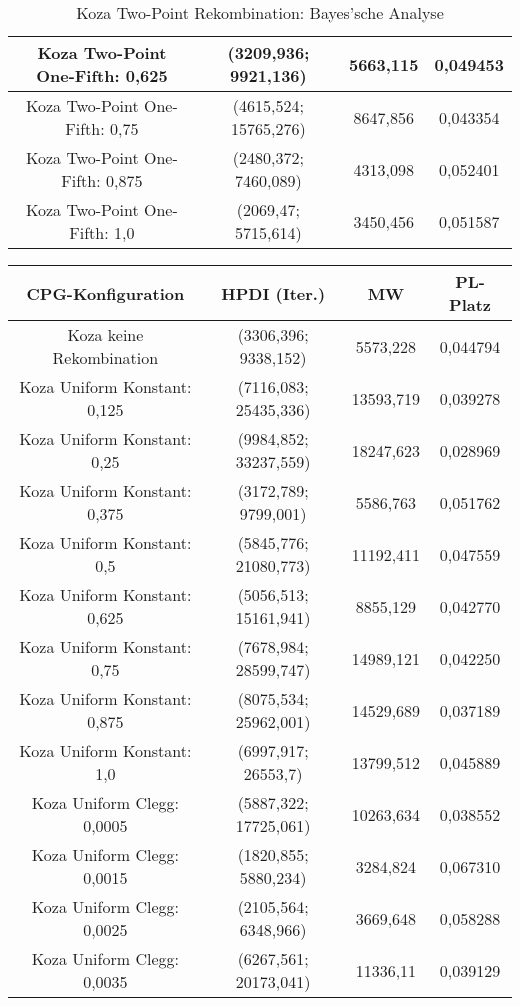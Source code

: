 \begin{table}[H]
\begin{tabular}{c | c | c | c}
		\hline
		Koza Two-Point One-Fifth: 0,625 & (3209,936; 9921,136) & 5663,115 & 0,049453\\
		\hline
		Koza Two-Point One-Fifth: 0,75 & (4615,524; 15765,276) & 8647,856 & 0,043354\\
		\hline
		Koza Two-Point One-Fifth: 0,875 & (2480,372; 7460,089) & 4313,098 & 0,052401\\
		\hline
		Koza Two-Point One-Fifth: 1,0 & (2069,47; 5715,614) & 3450,456 & 0,051587\\
	\end{tabular}
	\caption{Koza Two-Point Rekombination: Bayes'sche Analyse}
	\label{table:kozaTwoPointBayesian}
\end{table}


\begin{table}[H]
	\centering
	\begin{tabular}{c | c | c | c}
		\textbf{CPG-Konfiguration} & \textbf{HPDI (Iter.)} & \textbf{MW} & \textbf{PL-Platz}\\
		\hline
		Koza keine Rekombination & (3306,396; 9338,152) & 5573,228 & 0,044794\\
		\hline
		Koza Uniform Konstant: 0,125 & (7116,083; 25435,336) & 13593,719 & 0,039278\\
		\hline
		Koza Uniform Konstant: 0,25 & (9984,852; 33237,559) & 18247,623 & 0,028969\\
		\hline
		Koza Uniform Konstant: 0,375 & (3172,789; 9799,001) & 5586,763 & 0,051762\\
		\hline
		Koza Uniform Konstant: 0,5 & (5845,776; 21080,773) & 11192,411 & 0,047559\\
		\hline
		Koza Uniform Konstant: 0,625 & (5056,513; 15161,941) & 8855,129 & 0,042770\\
		\hline
		Koza Uniform Konstant: 0,75 & (7678,984; 28599,747) & 14989,121 & 0,042250\\
		\hline
		Koza Uniform Konstant: 0,875 & (8075,534; 25962,001) & 14529,689 & 0,037189\\
		\hline
		Koza Uniform Konstant: 1,0 & (6997,917; 26553,7) & 13799,512 & 0,045889\\
		\hline
		Koza Uniform Clegg: 0,0005 & (5887,322; 17725,061) & 10263,634 & 0,038552\\
		\hline
		Koza Uniform Clegg: 0,0015 & (1820,855; 5880,234) & 3284,824 & 0,067310\\
		\hline
		Koza Uniform Clegg: 0,0025 & (2105,564; 6348,966) & 3669,648 & 0,058288\\
		\hline
		Koza Uniform Clegg: 0,0035 & (6267,561; 20173,041) & 11336,11 & 0,039129\\

\end{tabular}
\end{table}
